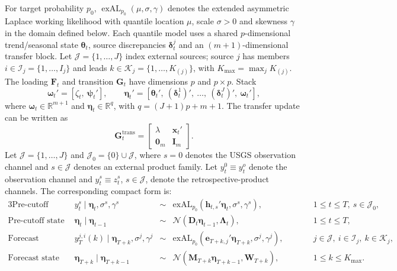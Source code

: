 \documentclass[APA,STIX1COL]{WileyNJD-v2}
\begin{document}
For target probability $p_0$, $\operatorname{exAL}_{p_0}(\mu,\sigma,\gamma)$ denotes the extended asymmetric Laplace working likelihood with quantile location $\mu$, scale $\sigma>0$ and skewness $\gamma$ in the domain defined below. Each quantile model uses a shared $p$-dimensional trend/seasonal state $\boldsymbol\theta_t$, source discrepancies $\boldsymbol\delta_t^j$ and an $(m+1)$-dimensional transfer block. Let $\mathcal J=\{1,\ldots,J\}$ index external sources; source $j$ has members $i\in\mathcal I_j=\{1,\ldots,I_j\}$ and leads $k\in\mathcal K_j=\{1,\ldots,K_{(j)}\}$, with $K_{\max}=\max_jK_{(j)}$. The loading $\mathbf F_t$ and transition $\mathbf G_t$ have dimensions $p$ and $p\times p$. Stack
\[
\boldsymbol{\omega}_t' = [\zeta_t,\ \boldsymbol{\psi}_t'], \qquad
\boldsymbol{\eta}_t' = [\boldsymbol{\theta}_t',\ (\boldsymbol{\delta}_t^1)',\ \ldots,\ (\boldsymbol{\delta}_t^J)',\ \boldsymbol{\omega}_t'],
\]
where \(\boldsymbol{\omega}_t \in \mathbb{R}^{m+1}\) and \(\boldsymbol{\eta}_t \in \mathbb{R}^{q}\), with \(q = (J+1)p + m + 1\). The transfer update can be written as
\[
\mathbf{G}^{\text{trans}}_t =
\begin{bmatrix}
\lambda & \mathbf{x}_t' \\
\mathbf{0}_m & \mathbf{I}_m
\end{bmatrix}.
\]
Let $\mathcal J=\{1,\ldots,J\}$ and \(\mathcal{J}_0=\{0\}\cup\mathcal{J}\), where \(s=0\) denotes the USGS observation channel and \(s\in\mathcal{J}\) denotes an external product family. Let \(y_t^0 \equiv y_t^o\) denote the observation channel and \(y_t^s \equiv z_t^s\), \(s\in\mathcal{J}\), denote the retrospective-product channels. The corresponding compact form is:
\begin{alignat}{3}
\text{Pre-cutoff observations:}\quad&
y_t^s \mid \boldsymbol{\eta}_t, \sigma^s, \gamma^s
&\sim{}& \text{exAL}_{p_0}\!\left(\mathbf{h}_{t,s}' \boldsymbol{\eta}_t, \sigma^s, \gamma^s\right),
&\qquad& 1 \le t \le T,\ s \in \mathcal{J}_0, \label{eq:compact_est_obs}
\\
\text{Pre-cutoff state evolution:}\quad&
\boldsymbol{\eta}_t \mid \boldsymbol{\eta}_{t-1}
&\sim{}& \mathcal{N}\!\left(\boldsymbol{D}_t \boldsymbol{\eta}_{t-1}, \boldsymbol{\Lambda}_t\right),
&\qquad& 1 \le t \le T, \label{eq:compact_est_state}
\\
\text{Forecast observations:}\quad&
y_T^{j,i}(k) \mid \boldsymbol{\eta}_{T+k}, \sigma^j, \gamma^j
&\sim{}& \text{exAL}_{p_0}\!\left(\mathbf{e}_{T+k,j}' \boldsymbol{\eta}_{T+k}, \sigma^j, \gamma^j\right),
&\qquad& j \in \mathcal{J},\ i \in \mathcal{I}_j,\ k \in \mathcal{K}_j, \label{eq:compact_fc_obs}
\\
\text{Forecast state evolution:}\quad&
\boldsymbol{\eta}_{T+k} \mid \boldsymbol{\eta}_{T+k-1}
&\sim{}& \mathcal{N}\!\left(\boldsymbol{M}_{T+k} \boldsymbol{\eta}_{T+k-1}, \mathbf{W}_{T+k}\right),
&\qquad& 1 \le k \le K_{\max}. \label{eq:compact_fc_state}
\end{alignat}
\end{document}

